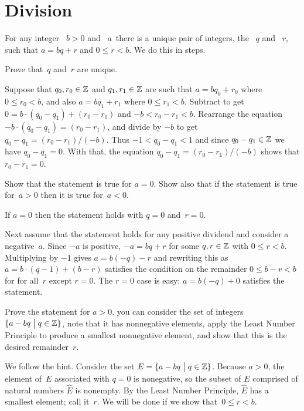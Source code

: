 \documentclass{test}  %
\begin{document}
\section{Division}
\begin{problem}  For any integer 
~$b>0$ and ~$a\,$ there is a unique pair of
integers, the ~$q$ and ~$r$,
such that $a=bq+r$ and $0\leq r<b$.
We do this in steps.
\begin{exes} 
\begin{exercise}
  Prove that~$q$ and~$r$ are unique.
\end{exercise}
\begin{answer}
  Suppose that $q_0,r_0\in\mathbb{Z}$ and $q_1,r_1\in\mathbb{Z}$ are such that
  $a=bq_0+r_0$ where $0\leq r_0<b$, and also
  $a=bq_1+r_1$ where $0\leq r_1<b$.
  Subtract to get $0=b\cdot(q_0-q_1)+(r_0-r_1)$ and $-b<r_0-r_1<b$.
  Rearrange the equation $-b\cdot(q_0-q_1)=(r_0-r_1)$,
  and divide by $-b$ to get $q_0-q_1=(r_0-r_1)/(-b)$.
  Thus  $-1<q_0-q_1<1$ and since $q_0-q_1\in\mathbb{Z}$ we have $q_0-q_1=0$.
  With that, the equation $q_0-q_1=(r_0-r_1)/(-b)$ shows that $r_0-r_1=0$.
\end{answer}
\begin{exercise}
  Show that the statement is true for $a=0$.
  Show also that if the statement is true for~$a>0$ then it is true
  for~$a<0$.
\end{exercise} 
\begin{answer}
  If $a=0$ then the statement holds with $q=0$ and~$r=0$.

  Next assume that the statement holds for any positive dividend
  and consider a negative~$a$.
  Since $-a$ is positive, $-a=bq+r$ for some 
  $q,r\in\mathbb{Z}$ with $0\leq r<b$.
  Multiplying by $-1$ gives $a=b(-q)-r$ and
  rewriting this as $a=b\cdot(q-1)+(b-r)$ satisfies the condition on the
  remainder $0\leq b-r<b$ for for all~$r$ except $r=0$.
  The $r=0$ case is easy: $a=b(-q)+0$ satisfies the statement.   
\end{answer}
\begin{exercise} 
  Prove the statement for $a>0$.
  \hint you can consider the set of integers $\{a-bq \bigm| q\in\mathbb{Z}\}$,
  note that it has nonnegative elements,
  apply the Least Number Principle
  to produce a smallest nonnegative element, and show that this is the desired
  remainder~$r$.
\end{exercise}
\begin{answer}
  We follow the hint.
  Consider the set $E=\{a-bq \bigm| q\in\mathbb{Z}\}$.
  Because $a>0$, the element of~$E$ associated with $q=0$ is nonegative,
  so the subset of $E$ comprised of natural numbers $\hat{E}$ is nonempty.
  By the Least Number Principle, $\hat{E}$ has a smallest element;
  call it~$r$.
  We will be done if we show that~$0\leq r<b$.


\end{answer}
\end{exes}
\end{problem}
\end{document}
